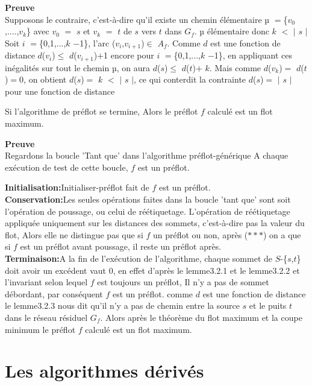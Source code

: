\textbf{Preuve} \\
Supposons le contraire, c'est-à-dire qu'il existe un chemin élémentaire $µ$ $=$\{$v_0$,....,$v_k$\} avec $v_0$ $=$ $s$ et $v_k$ $=$ $t$ de $s$ vers $t$ dans $G_f$.
$µ$ élémentaire donc $k$ $<$ $|$ $s$ $|$
Soit $i$ $=$\{0,1,...,$k$ $-$1\}, l'arc ($v_i$,$v_{i+1}$)$\in$ $A_f$. Comme $d$ est une fonction de distance $d$($v_i$)$\leq$ $d$($v_{i+1}$)$+$1 encore pour $i$ $=$\{0,1,...,$k$ $-$1\}, en appliquant ces inégalités sur tout le chemin $µ$, on aura
$d$($s$)$\leq$ $d$($t$)$+$ $k$. Mais comme $d$($v_k$)$=$ $d$($t$)$=$0, on obtient 
$d$($s$)$=$ $k$ $<$ $|$ $s$ $|$, ce qui conterdit la contrainte $d$($s$)$=$ $|$ $s$ $|$ pour une fonction de distance \\

\begin{thrm}
Si l'algorithme de préflot se termine, Alors le préflot $f$ calculé est un flot maximum.
\end{thrm}

\textbf{Preuve} \\
 Regardons la boucle 'Tant que' dans l'algorithme préflot-générique A chaque exécution de test de cette boucle, $f$ est un préflot.
 
 \textbf{Initialisation:}Initialiser-préflot fait de $f$ est un préflot.\\ 
 
 \textbf{Conservation:}Les seules opérations faites dans la boucle 'tant que' sont soit l'opération de poussage, ou celui de réétiquetage.  
 L'opération de réétiquetage appliquée uniquement sur les distances des sommets, c'est-à-dire pas la valeur du flot, Alors elle ne distingue pas que si $f$ un préflot ou non, après ($***$) on a que si $f$ est un préflot avant poussage, il reste un préflot après.\\

 
 \textbf{Terminaison:}A la fin de l'exécution de l'algorithme, chaque sommet de
$S$-\{$s$,$t$\} doit avoir un excédent vaut 0, en effet d'après le lemme3.2.1 et le lemme3.2.2 et l'invariant selon lequel $f$ est toujours un préflot, Il n'y a pas de sommet débordant, par conséquent $f$ est un préflot. comme $d$ est une fonction de distance le lemme3.2.3 nous dit qu'il n'y a pas de chemin entre la source $s$ et le puits $t$ dans le réseau résiduel $G_f$.
 Alors après le théorème du flot maximum et la coupe minimum le préflot $f$ calculé est un flot maximum.  


\section{Les algorithmes dérivés}

